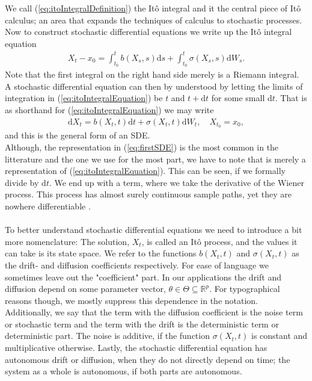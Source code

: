 We call (\ref{eq:itoIntegralDefinition}) the Itô integral and it the central piece of Itô calculus; an area that expands the techniques of calculus to stochastic processes. Now to construct stochastic differential equations we write up the Itô integral equation
\begin{align}
    X_t - x_0 = \int_{t_0}^t b(X_s, s)\mathrm{d}s + \int_{t_0}^t \sigma(X_s, s)\mathrm{d}W_s. \label{eq:itoIntegralEquation}
\end{align}
Note that the first integral on the right hand side merely is a Riemann integral. A stochastic differential equation can then by understood by letting the limits of integration in (\ref{eq:itoIntegralEquation}) be $t$ and $t+\mathrm{d}t$ for some small $\mathrm{d}t$. That is as shorthand for (\ref{eq:itoIntegralEquation}) we may write
\begin{align}
    \mathrm{d}X_t = b(X_t, t)\mathrm{d}t + \sigma(X_t, t)\mathrm{d}W_t, \quad X_{t_0} = x_0 \label{eq:firstSDE},
\end{align}
and this is the general form of an SDE. \\
Although, the representation in (\ref{eq:firstSDE}) is the most common in the litterature and the one we use for the most part, we have to note that is merely a representation of (\ref{eq:itoIntegralEquation}). This can be seen, if we formally divide by $\mathrm{d}t$. We end up with a term, where we take the derivative of the Wiener process. This process has almost surely continuous sample paths, yet they are nowhere differentiable \cite[theorem 11.22 and theorem 11.35]{Hansen2022}.\\\\
To better understand stochastic differential equations we need to introduce a bit more nomenclature: The solution, $X_t$, is called an Itô process, and the values it can take is its state space. We refer to the functions $b(X_t, t)$ and $\sigma(X_t, t)$ as the drift- and diffusion coefficients respectively. For ease of language we sometimes leave out the "coefficient" part. In our applications the drift and diffusion depend on some parameter vector, $\theta\in\Theta\subseteq\mathbb{R}^p$. For typographical reasons though, we mostly suppress this dependence in the notation. Additionally, we say that the term with the diffusion coefficient is the noise term or stochastic term and the term with the drift is the deterministic term or deterministic part. The noise is additive, if the function $\sigma(X_t, t)$ is constant and multiplicative otherwise. Lastly, the stochastic differential equation has autonomous drift or diffusion, when they do not directly depend on time; the system as a whole is autonomous, if both parts are autonomous.\\
